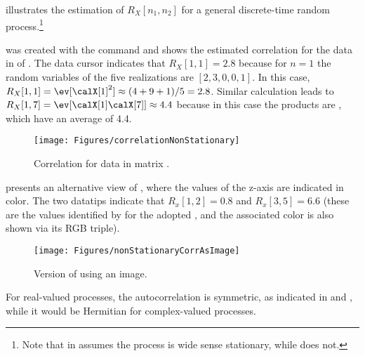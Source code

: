  illustrates the estimation of $R_{X}[n_1,n_2]$ for a general discrete-time random process.\footnote{Note that  in {\matlab} assumes the process is wide sense stationary, while  does not.}




 was created with the command  and shows the estimated correlation for the data in  of .  The data cursor indicates that $R_X[1,1] = 2.8$ because for $n=1$ the random variables of the five realizations are $[2,     3,     0,     0,     1]$. In this case, $R_X[1,1]=\ev[\calX[1]^2]\approx(4+9+1)/5=2.8$. Similar calculation leads to $R_X[1,7]=\ev[\calX[1] \calX[7]]\approx4.4$ because in this case the products 
are \co{[6,    12,     0,     0,     4]}, which have an average of 4.4.

\begin{figure}[htbp]
\centering
\texttt{[image: Figures/correlationNonStationary]}
\caption{Correlation for data in matrix .\label{fig:correlationNonStationary}}
\end{figure}

 presents an alternative view of ,
where the values of the z-axis are indicated in color. The two datatips indicate that $R_x[1,2]=0.8$ and $R_x[3,5]=6.6$ (these are the values identified by  for the adopted , and the associated color is also shown via its RGB triple).

\begin{figure}[htbp]
\centering
\texttt{[image: Figures/nonStationaryCorrAsImage]}
\caption{Version of  using an image.\label{fig:nonStationaryCorrAsImage}}
\end{figure}

For real-valued processes, the autocorrelation is symmetric, as indicated in  and , while it would be Hermitian for complex-valued processes.
\eExample 

